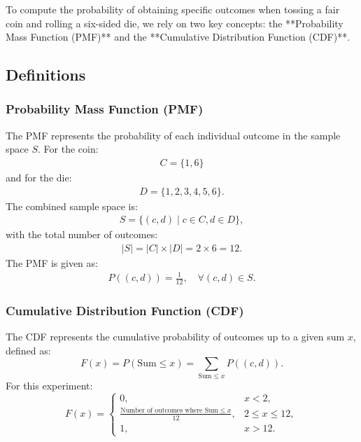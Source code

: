 \documentclass[journal]{IEEEtran}
\begin{document}
To compute the probability of obtaining specific outcomes when tossing a fair coin and rolling a six-sided die, we rely on two key concepts: the **Probability Mass Function (PMF)** and the **Cumulative Distribution Function (CDF)**.

\subsection*{Definitions}
\subsubsection*{Probability Mass Function (PMF)}
The PMF represents the probability of each individual outcome in the sample space $S$. For the coin:
\begin{align}
    C = \{1, 6\}
\end{align}
and for the die:
\begin{align}
    D = \{1, 2, 3, 4, 5, 6\}.
\end{align}
The combined sample space is:
\begin{align}
    S = \{(c, d) \mid c \in C, d \in D\},
\end{align}
with the total number of outcomes:
\begin{align}
    |S| = |C| \times |D| = 2 \times 6 = 12.
\end{align}
The PMF is given as:
\begin{align}
    P((c, d)) = \frac{1}{12}, \quad \forall (c, d) \in S.
\end{align}

\subsubsection*{Cumulative Distribution Function (CDF)}
The CDF represents the cumulative probability of outcomes up to a given sum $x$, defined as:
\[
F(x) = P(\text{Sum} \leq x) = \sum_{\text{Sum} \leq x} P((c, d)).
\]
For this experiment:
\[
F(x) = 
\begin{cases} 
0, & x < 2, \\
\frac{\text{Number of outcomes where Sum} \leq x}{12}, & 2 \leq x \leq 12, \\
1, & x > 12.
\end{cases}
\]
\end{document}
